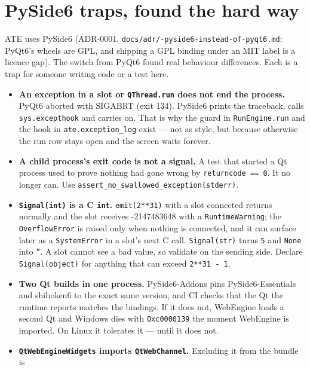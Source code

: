 \chapter{PySide6 traps, found the hard way}\label{ch:pyside}

ATE uses PySide6 (ADR-0001, \texttt{docs/\allowbreak{}adr/-pyside6-instead-of-pyqt6.md}: PyQt6's wheels are GPL,
and shipping a GPL binding under an MIT label is a licence gap). The switch from PyQt6 found real
behaviour differences. Each is a trap for someone writing code or a test here.

\begin{itemize}
  \item \textbf{An exception in a slot or \texttt{QThread.run} does not end the process.} PyQt6 aborted
    with SIGABRT (exit 134). PySide6 prints the traceback, calls \texttt{sys.excepthook} and carries on.
    That is why the guard in \texttt{RunEngine.run} and the hook in \texttt{ate.exception\_log} exist ---
    not as style, but because otherwise the run row stays open and the screen waits forever.
  \item \textbf{A child process's exit code is not a signal.} A test that started a Qt process used to
    prove nothing had gone wrong by \texttt{returncode == 0}. It no longer can. Use
    \texttt{assert\_\allowbreak{}no\_\allowbreak{}swallowed\_\allowbreak{}exception(stderr)}.
  \item \textbf{\texttt{Signal(int)} is a C \texttt{int}.} \texttt{emit(2**31)} with a slot connected
    returns normally and the slot receives -2147483648 with a \texttt{RuntimeWarning}; the
    \texttt{OverflowError} is raised only when nothing is connected, and it can surface later as a
    \texttt{SystemError} in a slot's next C call. \texttt{Signal(str)} turns \texttt{5} and \texttt{None}
    into \texttt{''}. A slot cannot see a bad value, so validate on the sending side. Declare
    \texttt{Signal(object)} for anything that can exceed \texttt{2**31 - 1}.
  \item \textbf{Two Qt builds in one process.} PySide6-Addons pins PySide6-Essentials and shiboken6 to the
    exact same version, and CI checks that the Qt the runtime reports matches the bindings. If it does not,
    WebEngine loads a second Qt and Windows dies with \texttt{0xc0000139} the moment WebEngine is
    imported. On Linux it tolerates it --- until it does not.
  \item \textbf{\texttt{QtWebEngineWidgets} imports \texttt{QtWebChannel}.} Excluding it from the bundle is

\end{itemize}
